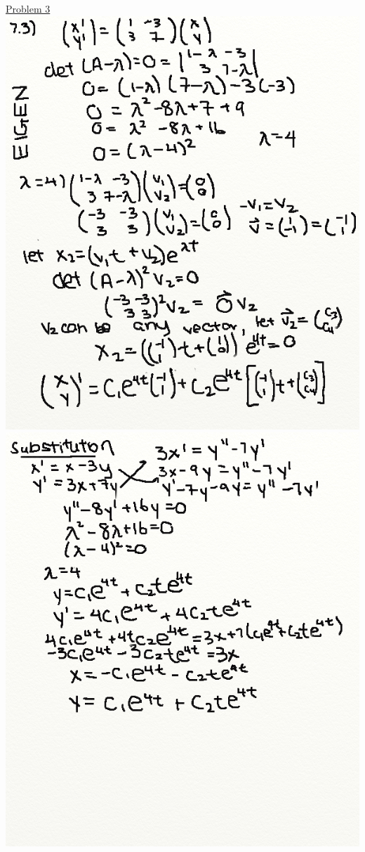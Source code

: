 \documentclass{article}
\begin{document}
\underline{Problem 3}\newline{}
\includegraphics[width=\textwidth,height=\textheight,keepaspectratio]{homework7q3p1.png}\clearpage{}
\includegraphics[width=\textwidth,height=\textheight,keepaspectratio]{homework7q3p2.png}\clearpage{}
\end{document}
